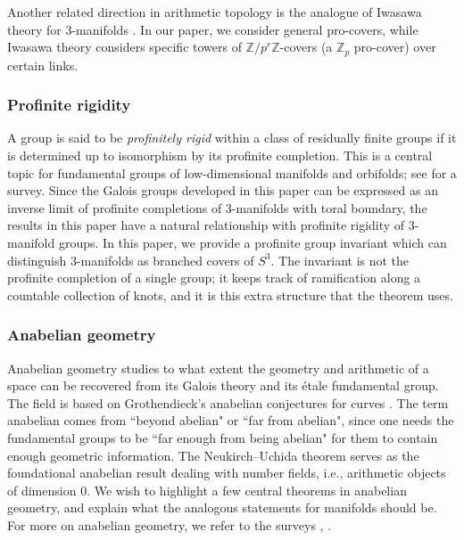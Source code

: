 \documentclass{amsart}
\theoremstyle{plain}
\theoremstyle{definition}
\theoremstyle{plain}
\theoremstyle{plain}
\theoremstyle{plain}
\theoremstyle{remark}
\theoremstyle{remark}
\theoremstyle{plain}
\theoremstyle{definition}
\theoremstyle{plain}
\theoremstyle{plain}
\theoremstyle{plain}
\numberwithin{equation}{section}
\begin{document}
\medskip

Another related direction in arithmetic topology is the analogue of Iwasawa theory for 3-manifolds \cite{hmm, uekiiwasawa, uekikida}. In our paper, we consider general pro-covers, while Iwasawa theory considers specific towers of $\mathbb{Z}/p^r\mathbb{Z}$-covers (a $\mathbb{Z}_p$ pro-cover) over certain links. 

\subsubsection{Profinite rigidity}\label{sec:profinite}

A group is said to be \emph{profinitely rigid} within a class of residually  finite groups if it is determined up to isomorphism by its profinite completion. This is a central topic for fundamental groups of low-dimensional manifolds and orbifolds; see \cite{reid} for a survey. Since the Galois groups developed in this paper can be expressed as an inverse limit of profinite completions of 3-manifolds with toral boundary, the results in this paper have a natural relationship with profinite rigidity of 3-manifold groups. In this paper, we provide a profinite group invariant which can distinguish 3-manifolds as branched covers of $S^3$. The invariant is not the profinite completion of a single group; it keeps track of ramification along a countable collection of knots, and it is this extra structure that the theorem uses. 

\subsubsection{Anabelian geometry}

Anabelian geometry studies to what extent the geometry and arithmetic of a space can be recovered from its Galois theory and its \'etale fundamental group. The field is based on Grothendieck's anabelian conjectures for curves \cite{grothendieck}. The term anabelian comes from ``beyond abelian" or ``far from abelian", since one needs the fundamental groups to be ``far enough from being abelian" for them to contain enough geometric information. The Neukirch--Uchida theorem serves as the foundational anabelian result dealing with number fields, i.e., arithmetic objects of dimension 0. We wish to highlight a few central theorems in anabelian geometry, and explain what the analogous statements for manifolds should be. For more on anabelian geometry, we refer to the surveys \cite{pop2011lectures}, \cite{mnt}. 
\end{document}
